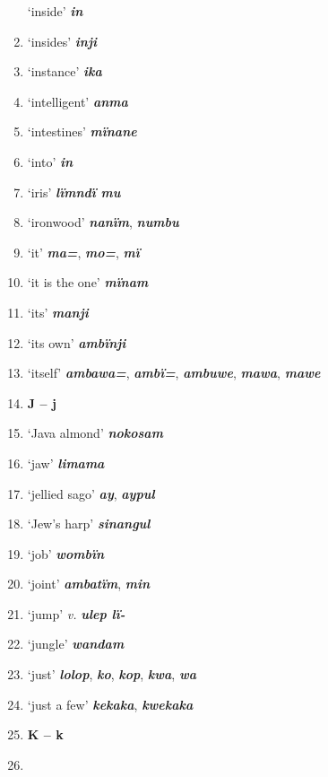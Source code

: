 \begin{enumerate}[noitemsep, label={}, align=left, widest=190, labelsep=1ex,leftmargin=*,itemindent=-10pt]
‘inside’ \textbf{\textit{in}} \item
‘insides’ \textbf{\textit{inji}} \item
‘instance’ \textbf{\textit{ika}} \item
‘intelligent’ \textbf{\textit{anma}} \item
‘intestines’ \textbf{\textit{mïnane}} \item
‘into’ \textbf{\textit{in}} \item
‘iris’ \textbf{\textit{lïmndï mu}} \item
‘ironwood’ \textbf{\textit{nanïm}}, \textbf{\textit{numbu}} \item
‘it’ \textbf{\textit{ma=}}, \textbf{\textit{mo=}}, \textbf{\textit{mï}} \item
‘it is the one’ \textbf{\textit{mïnam}} \item
‘its’ \textbf{\textit{manji}} \item
‘its own’ \textbf{\textit{ambïnji}} \item
‘itself’ \textbf{\textit{ambawa=}}, \textbf{\textit{ambï=}}, \textbf{\textit{ambuwe}}, \textbf{\textit{mawa}}, \textbf{\textit{mawe}}\\ \item

\noindent \textbf{J – j}\\ \item

‘Java almond’ \textbf{\textit{nokosam}} \item
‘jaw’ \textbf{\textit{limama}} \item
‘jellied sago’ \textbf{\textit{ay}}, \textbf{\textit{aypul}} \item
‘Jew’s harp’ \textbf{\textit{sinangul}} \item
‘job’ \textbf{\textit{wombïn}} \item
‘joint’ \textbf{\textit{ambatïm}}, \textbf{\textit{min}} \item
‘jump’ \textit{v.} \textbf{\textit{ulep lï-}} \item
‘jungle’ \textbf{\textit{wandam}} \item
‘just’ \textbf{\textit{lolop}}, \textbf{\textit{ko}}, \textbf{\textit{kop}}, \textbf{\textit{kwa}}, \textbf{\textit{wa}} \item
‘just a few’ \textbf{\textit{kekaka}}, \textbf{\textit{kwekaka}}\\ \item

\noindent \textbf{K – k}\\ \item


\end{enumerate}
